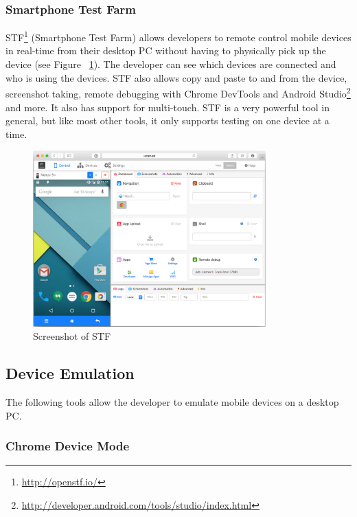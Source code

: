 \subsubsection{Smartphone Test Farm}

STF\footnote{\url{http://openstf.io/}} (Smartphone Test Farm) allows developers to remote control mobile devices in real-time from their desktop PC without having to physically pick up the device (see Figure ~\ref{fig:stf}). The developer can see which devices are connected and who is using the devices. STF also allows copy and paste to and from the device, screenshot taking, remote debugging with Chrome DevTools and Android Studio\footnote{\url{http://developer.android.com/tools/studio/index.html}} and more. It also has support for multi-touch. STF is a very powerful tool in general, but like most other tools, it only supports testing on one device at a time.

\begin{figure}[H]
  \centering
    \includegraphics[width=0.8\textwidth]{images/relatedwork/stf_2.png}
	\caption[Screenshot: Smartphone Test Farm]{Screenshot of STF}
	\label{fig:stf}
\end{figure}

\subsection{Device Emulation}

The following tools allow the developer to emulate mobile devices on a desktop PC. 

\subsubsection{Chrome Device Mode}

